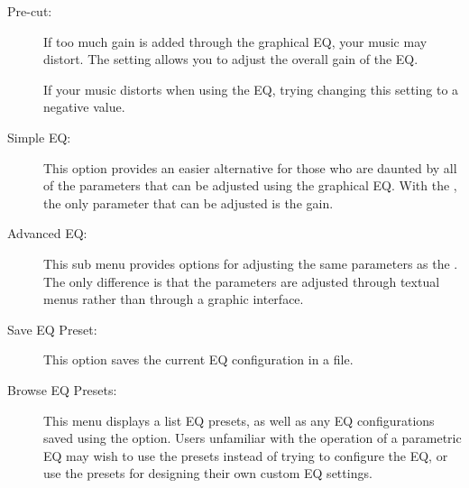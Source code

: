 {\begin {description}
  \item[Pre-cut:]
  If too much gain is added through the graphical EQ, your music may distort. 
  The  setting allows you to adjust the overall gain of the EQ.
  
  If your music distorts when using the EQ, trying changing this setting to a 
  negative value.

\item[Simple EQ:]
This option provides an easier alternative for those who are daunted by all of 
the parameters that can be adjusted using the graphical EQ.  With the 
, the only parameter that can be adjusted is the gain.

\item[Advanced EQ:]
This sub menu provides options for adjusting the same parameters as the 
.  The only difference is that the parameters are 
adjusted through textual menus rather than through a graphic interface.

\item[Save EQ Preset:]
This option saves the current EQ configuration in a  file.

\item[Browse EQ Presets:]
This menu displays a list EQ presets, as well as any EQ configurations saved 
using the  option.  Users unfamiliar with the 
operation of a parametric EQ may wish to use the presets instead of trying to 
configure the EQ, or use the presets for designing their own custom EQ 
settings.

\end{description}
}



